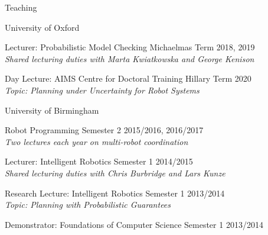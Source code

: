 
\begin{rSection}{Teaching}

\begin{rSubsection}{University of Oxford}{}{}{}
\item Lecturer: Probabilistic Model Checking  \hfill Michaelmas Term 2018, 2019\\
\textit{Shared lecturing duties with Marta Kwiatkowska and George Kenison}
\item Day Lecture: AIMS Centre for Doctoral Training   \hfill Hillary Term 2020\\
\textit{Topic: Planning under Uncertainty for Robot Systems }
\end{rSubsection}

\begin{rSubsection}{University of Birmingham}{}{}{}
\item Robot Programming  \hfill Semester 2 2015/2016, 2016/2017\\
\textit{Two lectures each year on multi-robot coordination}
\item Lecturer: Intelligent Robotics \hfill Semester 1 2014/2015\\
\textit{Shared lecturing duties with Chris Burbridge and Lars Kunze}
\item Research Lecture: Intelligent Robotics \hfill Semester 1 2013/2014\\
\textit{Topic: Planning with Probabilistic Guarantees }
\item Demonstrator: Foundations of Computer Science \hfill Semester 1 2013/2014
\end{rSubsection}



\end{rSection}
